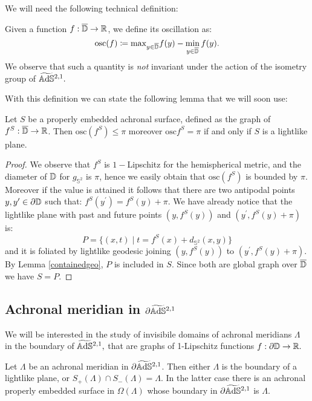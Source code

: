 We will need the following technical definition: 

\begin{definition}
    Given a function $f:\overline{\mathbb{D}}\to\mathbb{R}$, we define its oscillation as: 
    \[
        \text{osc}(f)\coloneqq \text{max}_{y\in\overline{\mathbb{D}}}f(y)-\min_{y\in\overline{\mathbb{D}}}f(y).
    \]
    We observe that such a quantity is \textit{not} invariant under the action of the isometry group of $\widetilde{\mathbb{A}\mathrm{d}\mathbb{S}}{}^{2,1}.$
\end{definition}

With this definition we can state the following lemma that we will soon use: 

\begin{lemma}\label{417}
    Let $S$ be a properly embedded achronal surface, defined as the graph of $f^S:\overline{\mathbb{D}}\to\mathbb{R}$. Then $\text{osc}(f^S)\leq\pi$ moreover $\text{osc}f^S=\pi$ if and only if $S$ is a lightlike plane. 
\end{lemma}
\begin{proof}
    We observe that $f^S$ is $1-$Lipschitz for the hemispherical metric, and the diameter of $\mathbb{D}$ for $g_{\mathbb{S}^2}$ is $\pi$, hence we easily obtain that $\text{osc}(f^S)$ is bounded by $\pi$. Moreover if the value is attained it follows that there are two antipodal points $y,y^{\prime} \in \partial\mathbb{D}$ such that: $f^S(y^{\prime})=f^S(y)+\pi$. We have already notice that the lightlike plane with past and future points $(y,f^S(y))$ and $(y^{\prime},f^S(y)+\pi)$ is: 
    \[
        P=\{(x,t)\;|\;t=f^S(x)+d_{\mathbb{S}^2}(x,y)\}
    \]
    and it is foliated by lightlike geodesic joining $(y,f^S(y))$ to $(y^{\prime},f^S(y)+\pi)$. By Lemma \ref{containedgeo}, $P$ is included in $S$. Since both are global graph over $\overline{\mathbb{D}}$ we have $S=P$.
\end{proof}

\subsection{Achronal meridian in $\partial\widetilde{\mathbb{A}\mathrm{d}\mathbb{S}}{}^{2,1}$}
We will be interested in the study of invisibile domains of achronal meridians $\Lambda$ in the boundary of $\widetilde{\mathbb{A}\mathrm{d}\mathbb{S}}{}^{2,1},$ that are graphs of 1-Lipschitz functions $f:\partial\mathbb{D}\to\mathbb{R}.$

\begin{lemma}\label{431}
    Let $\Lambda$ be an achronal meridian in $\partial\widetilde{\mathbb{A}\mathrm{d}\mathbb{S}}{}^{2,1}$. Then either $\Lambda$ is the boundary of a lightlike plane, or $S_+(\Lambda)\cap S_-(\Lambda)=\Lambda.$ In the latter case there is an achronal properly embedded surface in $\Omega(\Lambda)$ whose boundary in $\partial\widetilde{\mathbb{A}\mathrm{d}\mathbb{S}}{}^{2,1}$ is $\Lambda$.  
\end{lemma}

